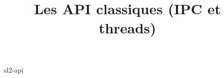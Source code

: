\documentclass {beamer}
\title {Les API classiques (IPC et threads)}
\begin{document}
 {sl2-api}
\end{document}
